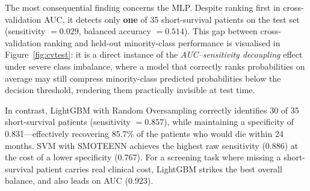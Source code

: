 \documentclass[a4paper,twoside]{article}
\begin{document}
\begin{table}[ht!]
  \centering
  \caption{Held-out test set performance for each classifier under its best
    cross-validation configuration. Bold indicates the best value per metric.}
  \label{tab:test}
\end{table}

The most consequential finding concerns the MLP. Despite ranking first in
cross-validation AUC, it detects only \textbf{one} of 35 short-survival patients
on the test set (sensitivity $= 0.029$, balanced accuracy $= 0.514$). This gap
between cross-validation ranking and held-out minority-class performance is
visualised in Figure~\ref{fig:cvtest}: it is a direct instance of the
\emph{AUC--sensitivity decoupling} effect under severe class imbalance, where a
model that correctly ranks probabilities on average may still compress
minority-class predicted probabilities below the decision threshold, rendering
them practically invisible at test time.

In contrast, LightGBM with Random Oversampling correctly identifies 30 of 35
short-survival patients (sensitivity $= 0.857$), while maintaining a specificity
of 0.831—effectively recovering 85.7\% of the patients who would die within
24 months. SVM with SMOTEENN achieves the highest raw sensitivity (0.886) at the
cost of a lower specificity (0.767). For a screening task where missing a short-survival patient carries real clinical
cost, LightGBM strikes the best overall balance, and also leads on AUC (0.923).
\end{document}
